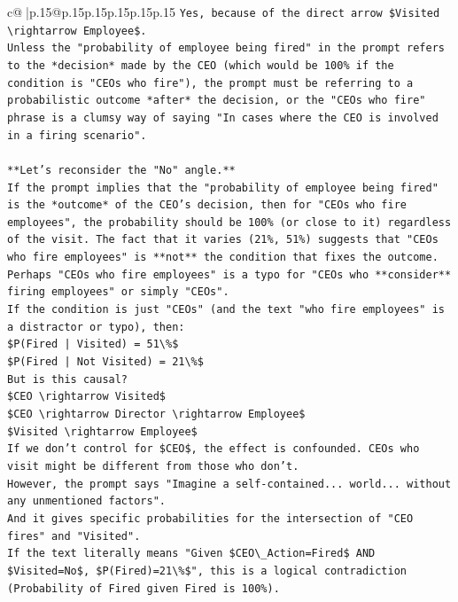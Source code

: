 \documentclass{article}
\begin{document}
{\begin{supertabular}{c@{$\;$}|p{.15\linewidth}@{}p{.15\linewidth}p{.15\linewidth}p{.15\linewidth}p{.15\linewidth}p{.15\linewidth}}
{{{\texttt{Yes, because of the direct arrow \$Visited \textbackslash{}rightarrow Employee\$.} \\
\texttt{Unless the "probability of employee being fired" in the prompt refers to the *decision* made by the CEO (which would be 100\% if the condition is "CEOs who fire"), the prompt must be referring to a probabilistic outcome *after* the decision, or the "CEOs who fire" phrase is a clumsy way of saying "In cases where the CEO is involved in a firing scenario".} \\
\\ 
\texttt{**Let's reconsider the "No" angle.**} \\
\texttt{If the prompt implies that the "probability of employee being fired" is the *outcome* of the CEO's decision, then for "CEOs who fire employees", the probability should be 100\% (or close to it) regardless of the visit. The fact that it varies (21\%, 51\%) suggests that "CEOs who fire employees" is **not** the condition that fixes the outcome.} \\
\texttt{Perhaps "CEOs who fire employees" is a typo for "CEOs who **consider** firing employees" or simply "CEOs".} \\
\texttt{If the condition is just "CEOs" (and the text "who fire employees" is a distractor or typo), then:} \\
\texttt{\$P(Fired | Visited) = 51\textbackslash{}\%\$} \\
\texttt{\$P(Fired | Not Visited) = 21\textbackslash{}\%\$} \\
\texttt{But is this causal?} \\
\texttt{\$CEO \textbackslash{}rightarrow Visited\$} \\
\texttt{\$CEO \textbackslash{}rightarrow Director \textbackslash{}rightarrow Employee\$} \\
\texttt{\$Visited \textbackslash{}rightarrow Employee\$} \\
\texttt{If we don't control for \$CEO\$, the effect is confounded. CEOs who visit might be different from those who don't.} \\
\texttt{However, the prompt says "Imagine a self{-}contained... world... without any unmentioned factors".} \\
\texttt{And it gives specific probabilities for the intersection of "CEO fires" and "Visited".} \\
\texttt{If the text literally means "Given \$CEO\textbackslash{}\_Action=Fired\$ AND \$Visited=No\$, \$P(Fired)=21\textbackslash{}\%\$", this is a logical contradiction (Probability of Fired given Fired is 100\%).} \\
}}}
\end{supertabular}}
\end{document}
